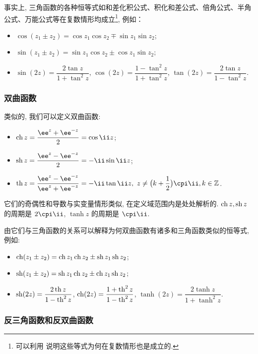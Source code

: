事实上, 三角函数的各种恒等式如和差化积公式、积化和差公式、倍角公式、半角公式、万能公式等在复数情形均成立\footnote{%
  可以利用 说明这些等式为何在复数情形也是成立的.
}, 例如：

\begin{itemize}
  \item $\cos(z_1\pm z_2)=\cos z_1 \cos z_2\mp \sin z_1 \sin z_2$;
  \item $\sin(z_1\pm z_2)=\sin z_1 \cos z_2\pm\cos z_1 \sin z_2$;
  \item $\sin(2z)=\dfrac{2\tan z}{1+\tan^2 z}$, 
    $\cos(2z)=\dfrac{1-\tan^2 z}{1+\tan^2 z}$, 
    $\tan(2z)=\dfrac{2\tan z}{1-\tan^2 z}$.
\end{itemize}


\subsubsection{双曲函数}

类似的, 我们可以定义双曲函数:
\begin{itemize}[addsep]
  \item {} $\ch z=\dfrac{\ee^z+\ee^{-z}}2=\cos \ii z$;
  \item {} $\sh z=\dfrac{\ee^z-\ee^{-z}}2=-\ii\sin \ii z$;
  \item {} $\tanh z=\dfrac{\ee^z-\ee^{-z}}{\ee^z+\ee^{-z}}=-\ii\tan \ii z,\ z\neq \bigl(k+\dfrac12\bigr)\cpi\ii, k\in\BZ$.
\end{itemize}

它们的奇偶性和导数与实变量情形类似, 在定义域范围内是处处解析的.
$\operatorname{ch} z,\operatorname{sh} z$ 的周期是 $2\cpi\ii$, $\tanh z$ 的周期是 $\cpi\ii$.

由它们与三角函数的关系可以解释为何双曲函数有诸多和三角函数类似的恒等式, 例如:

\begin{itemize}[addsep]
  \item $\operatorname{ch}(z_1\pm z_2)=\operatorname{ch} z_1 \operatorname{ch} z_2\pm\operatorname{sh} z_1 \operatorname{sh} z_2$;
  \item $\operatorname{sh}(z_1\pm z_2)=\operatorname{sh} z_1 \operatorname{ch} z_2\pm\operatorname{ch} z_1 \operatorname{sh} z_2$;
  \item $\operatorname{sh}(2z)=\dfrac{2\operatorname{th} z}{1-\operatorname{th}^2 z}$, $\operatorname{ch}(2z)=\dfrac{1+\operatorname{th}^2 z}{1-\operatorname{th}^2 z}$, $\tanh(2z)=\dfrac{2\tanh z}{1+\tanh^2 z}$.
\end{itemize}


\subsubsection{反三角函数和反双曲函数}

